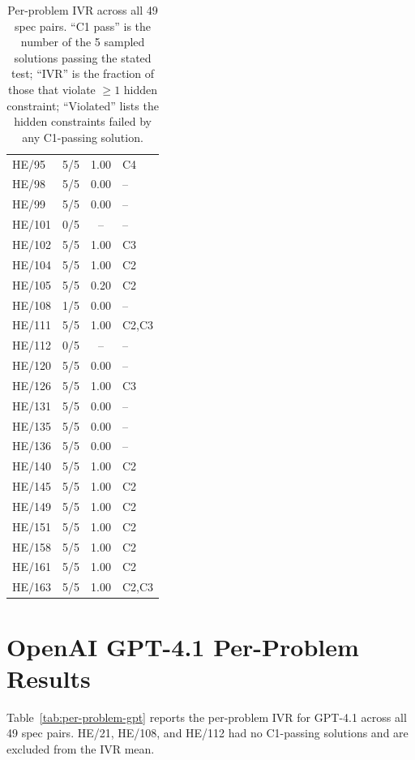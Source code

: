 \documentclass[11pt]{article}
\begin{document}
\begin{table}[ht]
\begin{tabular}{@{}lccl@{}}
HE/95 & 5/5 & 1.00 & C4 \\
HE/98 & 5/5 & 0.00 & -- \\
HE/99 & 5/5 & 0.00 & -- \\
HE/101 & 0/5 & -- & -- \\
HE/102 & 5/5 & 1.00 & C3 \\
HE/104 & 5/5 & 1.00 & C2 \\
HE/105 & 5/5 & 0.20 & C2 \\
HE/108 & 1/5 & 0.00 & -- \\
HE/111 & 5/5 & 1.00 & C2,C3 \\
HE/112 & 0/5 & -- & -- \\
HE/120 & 5/5 & 0.00 & -- \\
HE/126 & 5/5 & 1.00 & C3 \\
HE/131 & 5/5 & 0.00 & -- \\
HE/135 & 5/5 & 0.00 & -- \\
HE/136 & 5/5 & 0.00 & -- \\
HE/140 & 5/5 & 1.00 & C2 \\
HE/145 & 5/5 & 1.00 & C2 \\
HE/149 & 5/5 & 1.00 & C2 \\
HE/151 & 5/5 & 1.00 & C2 \\
HE/158 & 5/5 & 1.00 & C2 \\
HE/161 & 5/5 & 1.00 & C2 \\
HE/163 & 5/5 & 1.00 & C2,C3 \\
\bottomrule
\end{tabular}
\caption{Per-problem IVR across all 49 spec pairs. ``C1 pass'' is the
number of the 5 sampled solutions passing the stated test; ``IVR'' is the
fraction of those that violate $\geq 1$ hidden constraint; ``Violated''
lists the hidden constraints failed by any C1-passing solution.}
\label{tab:per-problem-claude}
\end{table}

\section{OpenAI GPT-4.1 Per-Problem Results}
\label{app:results-gpt}
Table~\ref{tab:per-problem-gpt} reports the per-problem IVR for GPT-4.1 across
all 49 spec pairs. HE/21,
HE/108, and HE/112 had no C1-passing solutions and are excluded from the IVR mean.
\end{document}
